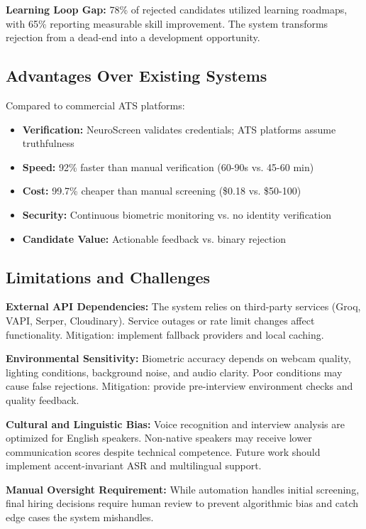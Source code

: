 \documentclass[conference]{IEEEtran}
\begin{document}
\textbf{Learning Loop Gap:} 78\% of rejected candidates utilized learning roadmaps, with 65\% reporting measurable skill improvement. The system transforms rejection from a dead-end into a development opportunity.

\subsection{Advantages Over Existing Systems}

Compared to commercial ATS platforms:
\begin{itemize}
    \item \textbf{Verification:} NeuroScreen validates credentials; ATS platforms assume truthfulness
    \item \textbf{Speed:} 92\% faster than manual verification (60-90s vs. 45-60 min)
    \item \textbf{Cost:} 99.7\% cheaper than manual screening (\$0.18 vs. \$50-100)
    \item \textbf{Security:} Continuous biometric monitoring vs. no identity verification
    \item \textbf{Candidate Value:} Actionable feedback vs. binary rejection
\end{itemize}

\subsection{Limitations and Challenges}

\textbf{External API Dependencies:} The system relies on third-party services (Groq, VAPI, Serper, Cloudinary). Service outages or rate limit changes affect functionality. Mitigation: implement fallback providers and local caching.

\textbf{Environmental Sensitivity:} Biometric accuracy depends on webcam quality, lighting conditions, background noise, and audio clarity. Poor conditions may cause false rejections. Mitigation: provide pre-interview environment checks and quality feedback.

\textbf{Cultural and Linguistic Bias:} Voice recognition and interview analysis are optimized for English speakers. Non-native speakers may receive lower communication scores despite technical competence. Future work should implement accent-invariant ASR and multilingual support.

\textbf{Manual Oversight Requirement:} While automation handles initial screening, final hiring decisions require human review to prevent algorithmic bias and catch edge cases the system mishandles.
\end{document}

